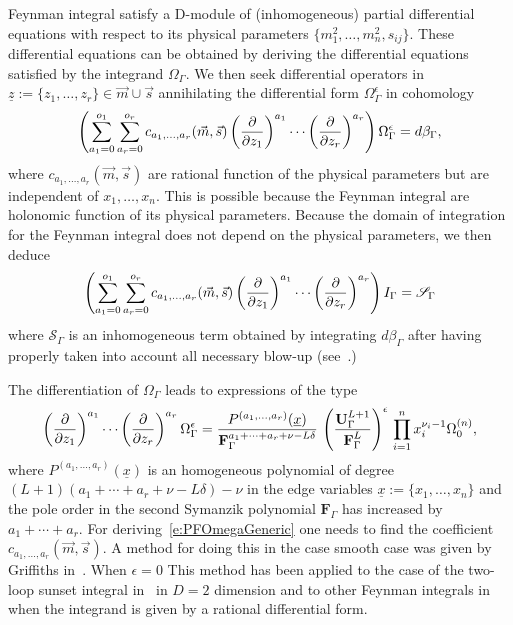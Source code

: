 \documentclass[a4paper,12pt]{article}
\numberwithin{equation}{section}
\numberwithin{figure}{section}
\begin{document}
Feynman integral satisfy a D-module of (inhomogeneous) partial
differential equations with respect to its physical parameters
$ \{m_1^2,\dots,m_n^2,s_{ij}\}$.
These differential equations can be obtained by deriving the
differential equations satisfied by the integrand $\Omega_\Gamma$.
We then seek differential operators in $\underline
z:=\{z_1,\dots,z_r\} \in \vec m \cup \vec s$
annihilating the differential form $\Omega_\Gamma^\epsilon$ in cohomology
\begin{equation}\label{e:PFOmegaGeneric}
\left(  \sum_{a_1=0}^{o_1} \sum_{ a_r=0}^{o_r}  c_{a_1,\dots, a_r}(\vec m,\vec s) \left(\partial\over \partial z_1\right)^{a_1}\cdots\left(\partial
  \over\partial z_r\right)^{a_r}  \right)\Omega_\Gamma^\epsilon=d\beta_\Gamma,
\end{equation}
where $  c_{a_1,\dots, a_r}(\vec m,\vec s)$ are rational function of the physical
parameters but are independent of $x_1,\dots,x_n$.  This is possible
because the Feynman integral are holonomic function of its physical parameters.
Because the domain of integration for the Feynman integral does not
depend on the physical parameters, we then deduce
\begin{equation}\label{e:PDEintFeynman}
  \left( \sum_{a_1=0}^{o_1} \sum_{ a_r=0}^{o_r}  c_{a_1,\dots, a_r}(\vec m,\vec s) \left(\partial\over \partial z_1\right)^{a_1}\cdots\left(\partial
  \over\partial z_r\right)^{a_r}  \right)I_\Gamma=\mathscr{S}_\Gamma
\end{equation}
where $\mathscr{S}_\Gamma$ is an inhomogeneous term obtained by
integrating $d\beta_\Gamma$ after having properly taken into account
all necessary blow-up (see~\cite{bek,Brown:2009ta,Bloch:2016izu,muller2014picard}.)



The    differentiation of $\Omega_\Gamma$ 
leads  to  expressions of the type
\begin{equation}\label{e:PDE}
\left(\partial\over \partial z_1\right)^{a_1}\cdots\left(\partial
  \over\partial z_r\right)^{a_r} \Omega_\Gamma^\epsilon=
{  P^{(a_1,\dots,a_r)}(\underline x)\over \textbf{F}_\Gamma^{a_1+\cdots +a_r+\nu-L\delta}}\,
  \left(\textbf{U}_\Gamma^{L+1}\over \textbf{F}_\Gamma^L\right)^{\epsilon} \, \prod_{i=1}^n x_i^{\nu_i-1} \Omega^{(n)}_0  ,
\end{equation}
where $  P^{(a_1,\dots,a_r)}(\underline x)$ is an
  homogeneous polynomial of degree $(L+1)(a_1+\cdots+a_r+\nu-L\delta)-\nu$ in
 the edge variables $\underline x:=\{x_1,\dots, x_n\}$ and the
  pole order in the second Symanzik polynomial $\textbf{F}_\Gamma$ has increased by
  $a_1+\cdots+a_r$.
  For deriving~\eqref{e:PFOmegaGeneric} one needs to find the
  coefficient $c_{a_1,\dots,a_r}(\vec m,\vec s)$.  A method for doing this in the
  case smooth case was given by Griffiths in~\cite{Griffiths_1969,Dwork_1962,Dwork_1964}.
When $\epsilon=0$ 
This method has been applied to the case of the two-loop sunset
integral in~\cite{Bloch:2016izu} in $D=2$ dimension and to other Feynman
integrals in~\cite{Lairez:2022zkj}  when the integrand is given by a rational
differential form.
  
\end{document}
